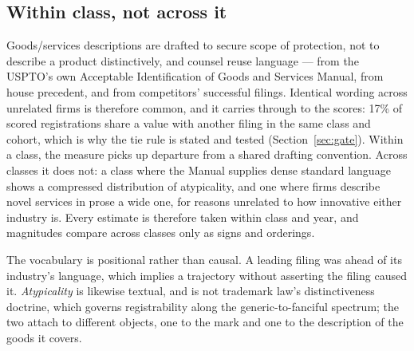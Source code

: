 \subsection{Within class, not across it}

Goods/services descriptions are drafted to secure scope of protection, not to
describe a product distinctively, and counsel reuse language --- from the
USPTO's own Acceptable Identification of Goods and Services Manual, from house
precedent, and from competitors' successful filings. Identical wording across
unrelated firms is therefore common, and it carries through to the scores:
17\% of scored registrations share a value with another filing in the same
class and cohort, which is why the tie rule is stated and tested
(Section~\ref{sec:gate}). Within a class, the measure picks up departure from
a shared drafting convention. Across classes it does not: a class where the
Manual supplies dense standard language shows a compressed distribution of
atypicality, and one where firms describe novel services in prose a wide one,
for reasons unrelated to how innovative either industry is. Every estimate is
therefore taken within class and year, and magnitudes compare across classes
only as signs and orderings.

The vocabulary is positional rather than causal. A leading filing was ahead of
its industry's language, which implies a trajectory without asserting the
filing caused it. \emph{Atypicality} is likewise textual, and is not trademark
law's distinctiveness doctrine, which governs registrability along the
generic-to-fanciful spectrum; the two attach to different objects, one to the
mark and one to the description of the goods it covers.
